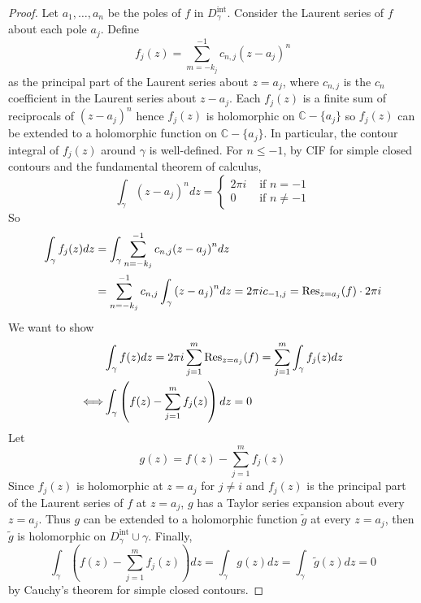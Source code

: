 \begin{proof}
	Let $a_1, \dots, a_n$ be the poles of $f$ in $D_{\gamma}^{\text{int}}$. Consider the Laurent series of $f$ about each pole $a_j$. Define
	\[
		f_j(z) = \sum_{m = -k_j}^{-1} c_{n, j} {(z - a_j)}^n
	\]
	as the principal part of the Laurent series about $z = a_j$, where $c_{n, j}$ is the $c_n$ coefficient in the Laurent series about $z - a_j$. Each $f_j(z)$ is a finite sum of reciprocals of ${(z - a_j)}^n$ hence $f_j(z)$ is holomorphic on $\mathbb{C} - \{ a_j \}$ so $f_j(z)$ can be extended to a holomorphic function on $\mathbb{C} - \{ a_j \}$. In particular, the contour integral of $f_j(z)$ around $\gamma$ is well-defined. For $n \le -1$, by CIF for simple closed contours and the fundamental theorem of calculus,
	\[
		\int_{\gamma} {(z - a_j)}^n dz = \begin{cases}
			2 \pi i & \text{ if } n = -1 \\
			0 & \text{ if } n \ne -1
		\end{cases}
	\]
	So
	\[
		\begin{aligned}
			\int_{\gamma} f_j(z) dz & = \int_{\gamma} \sum_{n = -k_j}^{-1} c_{n, j} {(z - a_j)}^n dz \\
			& = \sum_{n = -k_j}^{-1} c_{n, j} \int_{\gamma} {(z - a_j)}^n dz = 2 \pi i c_{-1, j} = \text{Res}_{z = a_j}(f) \cdot 2 \pi i
		\end{aligned}
	\]
	We want to show
	\[
		\begin{aligned}
			& \int_{\gamma} f(z) dz = 2 \pi i \sum_{j = 1}^{m} \text{Res}_{z = a_j}(f) = \sum_{j = 1}^{m} \int_{\gamma} f_j(z) dz \\
			\Longleftrightarrow & \int_{\gamma} \left( f(z) - \sum_{j = 1}^{m} f_j(z) \right) dz = 0
		\end{aligned}
	\]
	Let
	\[
		g(z) = f(z) - \sum_{j = 1}^{m} f_j(z)
	\]
	Since $f_j(z)$ is holomorphic at $z = a_j$ for $j \ne i$ and $f_j(z)$ is the principal part of the Laurent series of $f$ at $z = a_j$, $g$ has a Taylor series expansion about every $z = a_j$. Thus $g$ can be extended to a holomorphic function $\tilde{g}$ at every $z = a_j$, then $\tilde{g}$ is holomorphic on $D_{\gamma}^{\text{int}} \cup \gamma$. Finally,
	\[
		\int_{\gamma} \left( f(z) - \sum_{j = 1}^{m} f_j(z) \right) dz = \int_{\gamma} g(z) dz = \int_{\gamma} \tilde{g}(z) dz = 0
	\]
	by Cauchy's theorem for simple closed contours.
\end{proof}

